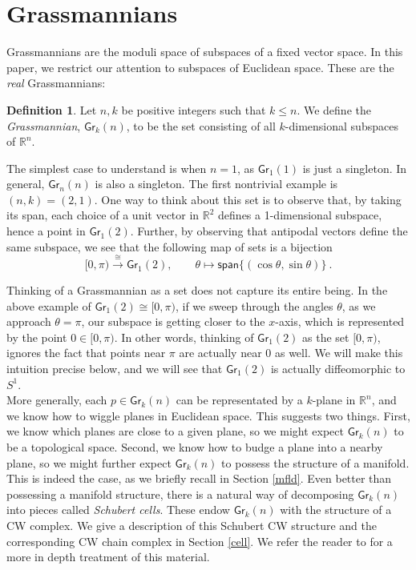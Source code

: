 \documentclass{article}
\newcommand{\bb}[1]{\mathbb{#1}}
\newcommand{\msf}[1]{\mathsf{#1}}
\newcommand{\gr}{\msf{Gr}}
\newcommand{\spn}{\msf{span}}
\theoremstyle{definition}
\newtheorem{definition}[theorem]{Definition}
\begin{document}
\section{Grassmannians}
\label{sec:grassmannians}
Grassmannians are the moduli space
of subspaces of a fixed vector space. In this paper, we restrict our attention
to subspaces of Euclidean space. These are the \emph{real} Grassmannians:

\begin{definition}
    Let $n,k$ be positive integers such that $k \le n$. We define the 
    \emph{Grassmannian}, $\gr_k(n)$, to be the set consisting of all $k$-dimensional subspaces of $\bb{R}^n$.
\end{definition}

The simplest case to understand is when $n=1$, as $\gr_1(1)$ is just a singleton. 
In general, $\gr_n(n)$ is also a singleton. The first nontrivial example is $(n,k) = (2,1)$.
One way to think about this set is to observe that, by taking its span, each choice of a unit vector
in $\bb{R}^2$ defines a 1-dimensional subspace, hence a point in $\gr_1(2)$.
Further, by observing that antipodal vectors define the same subspace, 
we see that the following map of sets is a bijection
$$[0,\pi) \xrightarrow{\cong} \gr_1(2), \qquad \theta \mapsto \spn\{(\cos\theta, \sin\theta)\}~.$$

Thinking of a Grassmannian as a set does not capture its entire being. 
In the above example of $\gr_1(2) \cong [0,\pi)$, if we sweep through the angles $\theta$, as we approach 
$\theta=\pi$, our subspace is getting closer to the $x$-axis, which is represented by the point $0 \in [0,\pi)$. In 
other words, thinking of $\gr_1(2)$ as the set $[0,\pi)$, ignores the fact that points near $\pi$ are actually near $0$
as well. We will make this intuition precise below, and we will see that $\gr_1(2)$ is actually diffeomorphic to 
$S^1$. \\

More generally, each $p \in \gr_k(n)$ can be representated by a $k$-plane in $\bb{R}^n$, 
and we know how to wiggle planes in Euclidean space.
This suggests two things. First, we know which planes are close to a given plane, so we might expect
$\gr_k(n)$ to be a topological space. Second, we know how to budge a plane into a nearby plane, so we might further
expect $\gr_k(n)$ to possess the structure of a manifold. 
This is indeed the case, as we briefly recall in Section
\ref{mfld}. Even better than possessing a manifold structure, there is a natural way of decomposing $\gr_k(n)$
into pieces called \emph{Schubert cells}. These endow $\gr_k(n)$ with the structure of a CW complex. We give
a description of this Schubert CW structure and the corresponding CW chain complex in Section \ref{cell}. 
We refer the reader to \cite{characteristic} for a more in depth treatment of this material.  \\
\end{document}
